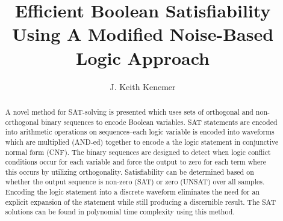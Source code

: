 \documentclass[reqno]{amsart}
\theoremstyle{definition}
\theoremstyle{remark}
\begin{document}

\title{Efficient Boolean Satisfiability Using A Modified Noise-Based Logic Approach }

\author{J. Keith Kenemer}






\begin{abstract}
A novel method for SAT-solving is presented which uses sets of orthogonal and non-orthogonal binary sequences to encode Boolean variables. SAT statements are encoded into arithmetic operations on sequences--each logic variable is encoded into waveforms which are multiplied (AND-ed) together to encode a the logic statement in conjunctive normal form (CNF).  The binary sequences are designed to detect when logic conflict conditions occur for each variable and force the output to zero for each term where this occurs by utilizing orthogonality. Satisfiability can be determined based on whether the output sequence is non-zero (SAT) or zero (UNSAT) over all samples. Encoding the logic statement into a discrete waveform eliminates the need for an explicit expansion of the statement while still producing a discernible result. The SAT solutions can be found in polynomial time complexity using this method.

\end{abstract}

\end{document}
